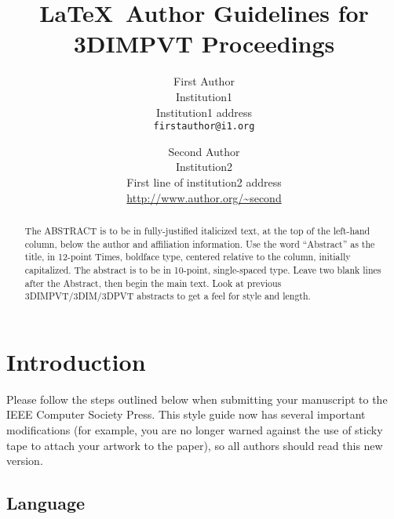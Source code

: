 \message{ !name(egpaper_for_review.tex)}\documentclass[10pt,twocolumn,letterpaper]{article}
\begin{document}


\title{\LaTeX\ Author Guidelines for 3DIMPVT Proceedings}

\author{First Author\\
  Institution1\\
  Institution1 address\\
  {\tt\small firstauthor@i1.org}
  \and
  Second Author\\
  Institution2\\
  First line of institution2 address\\
  {\small\url{http://www.author.org/~second}} }

\maketitle

\begin{abstract}
  The ABSTRACT is to be in fully-justified italicized text, at the top
  of the left-hand column, below the author and affiliation
  information. Use the word ``Abstract'' as the title, in 12-point
  Times, boldface type, centered relative to the column, initially
  capitalized. The abstract is to be in 10-point, single-spaced type.
  Leave two blank lines after the Abstract, then begin the main text.
  Look at previous 3DIMPVT/3DIM/3DPVT abstracts to get a feel for
  style and length.
\end{abstract}

\section{Introduction}

Please follow the steps outlined below when submitting your manuscript
to the IEEE Computer Society Press.  This style guide now has several
important modifications (for example, you are no longer warned against
the use of sticky tape to attach your artwork to the paper), so all
authors should read this new version.

\subsection{Language}
\end{document}
